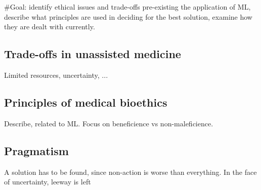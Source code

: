 \#Goal: identify ethical issues and trade-offs pre-existing the application of ML,
       describe what principles are used in deciding for the best solution,
       examine how they are dealt with currently.

\subsection{Trade-offs in unassisted medicine}
Limited resources, uncertainty, ...

\subsection{Principles of medical bioethics}
Describe, related to ML.
Focus on beneficience vs non-maleficience.

\subsection{Pragmatism}
A solution has to be found, since non-action is worse than everything.
In the face of uncertainty, leeway is left
